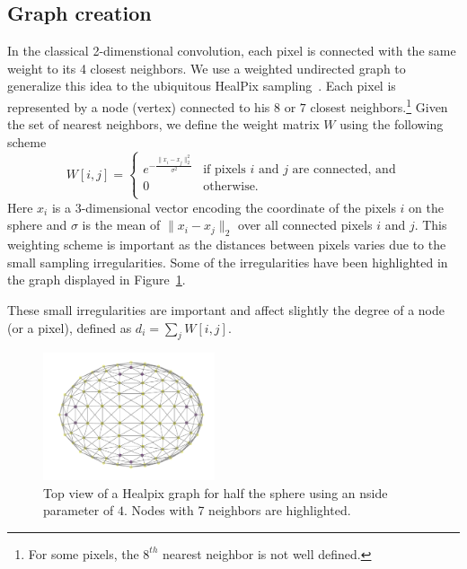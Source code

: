 \documentclass[final,twocolumn,3p,times,authoryear]{elsarticle}
\newcommand{\1}{\b{1}}              %
\newcommand{\0}{\b{0}}              %
\begin{document}
\subsection{Graph creation}
In the classical 2-dimenstional convolution, each pixel is connected with the
same weight to its 4 closest neighbors. We use a weighted undirected graph to
generalize this idea to the ubiquitous HealPix
sampling~\citep{gorski2005healpix}.  Each pixel is represented by a node
(vertex) connected to his $8$ or $7$ closest neighbors.\footnote{For some
pixels, the $8^{th}$ nearest neighbor is not well defined.} Given the set of
nearest neighbors, we define the weight matrix $W$ using the following scheme
\begin{equation}
W[i,j]=\begin{cases}
e^{-\frac{\|x_i-x_j\|_2^2}{\sigma^2}} & \text{if pixels $i$ and $j$ are connected, and}\\
0 & \text{otherwise.}\\
\end{cases}
\end{equation}
Here $x_i$ is a 3-dimensional vector encoding the coordinate of the pixels $i$
on the sphere and $\sigma$ is the mean of $\|x_i-x_j\|_2$ over all connected
pixels $i$ and $j$. This weighting scheme is important as the distances between
pixels varies due to the small sampling irregularities. Some of the
irregularities have been highlighted in the graph displayed in
Figure~\ref{fig:healpix_graph_4}.

These small irregularities are important and affect slightly the degree of a 
node (or a pixel), defined as $d_i =\sum_j W[i,j]$. 

\begin{figure}[!ht]
\centering
\vspace{-0.5cm}
\includegraphics[width=0.45\textwidth]{figures/half_graph_4.pdf}
\vspace{-0.5cm}
\caption{
Top view of a Healpix graph for half the sphere using an nside parameter of $4$.
Nodes with 7 neighbors are highlighted.
}
\label{fig:healpix_graph_4}
\end{figure}
\end{document}
